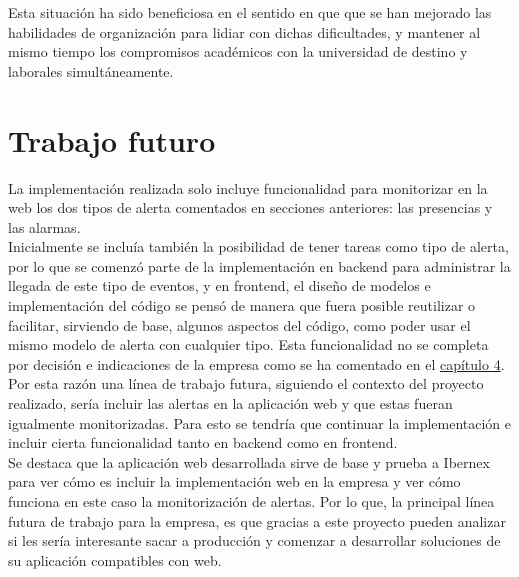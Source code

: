 Esta situación ha sido beneficiosa en el sentido en que que se han mejorado las habilidades de organización para lidiar con dichas dificultades, y mantener al mismo tiempo los compromisos académicos con la universidad de destino y laborales simultáneamente.


\section{Trabajo futuro}
\label{section-trabajo-futuro}

La implementación realizada solo incluye funcionalidad para monitorizar en la web los dos tipos de alerta comentados en secciones anteriores: las presencias y las alarmas.\\

Inicialmente se incluía también la posibilidad de tener tareas como tipo de alerta, por lo que se comenzó parte de la implementación en backend para administrar la llegada de este tipo de eventos, y en frontend, el diseño de modelos e implementación del código se pensó de manera que fuera posible reutilizar o facilitar, sirviendo de base, algunos aspectos del código, como poder usar el mismo modelo de alerta con cualquier tipo. Esta funcionalidad no se completa por decisión e indicaciones de la empresa como se ha comentado en el \hyperref[section-gestion-proyecto]{capítulo 4}.
Por esta razón una línea de trabajo futura, siguiendo el contexto del proyecto realizado, sería incluir las alertas en la aplicación web y que estas fueran igualmente monitorizadas. Para esto se tendría que continuar la implementación e incluir cierta funcionalidad tanto en backend como en frontend.\\

Se destaca que la aplicación web desarrollada sirve de base y prueba a Ibernex para ver cómo es incluir la implementación web en la empresa y ver cómo funciona en este caso la monitorización de alertas. Por lo que, la principal línea futura de trabajo para la empresa, es que gracias a este proyecto pueden analizar si les sería interesante sacar a producción y comenzar a desarrollar soluciones de su aplicación compatibles con web.